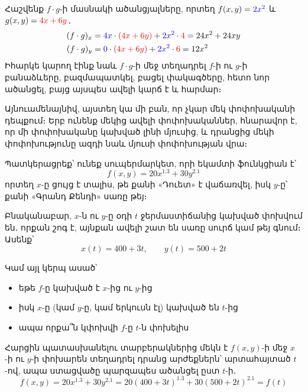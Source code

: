 
\begin{example}
Հաշվենք $f\cdot g$-ի մասնակի ածանցյալները, որտեղ $f(x,y) = {\color{myblue}{2x^2}}$ և $g(x,y) ={\color{myred}{4x + 6y}}$․
\begin{align*}
(f\cdot g)_{x} &= {\color{myblue}{4x}}  \cdot {\color{myred}{(4x + 6y)}} + {\color{myblue}{2x^{2}}} \cdot {\color{myred}{4}} = 24x^{2} + 24xy\\
(f\cdot g)_{y} &= {\color{myblue} 0}\cdot {\color{myred}{(4x + 6y)}} + {\color{myblue}{2x^{2}}} \cdot {\color{myred} 6} = 12x^{2}
\end{align*}
Իհարկե կարող էինք նաև $f\cdot g$-ի մեջ տեղադրել $f$-ի ու $g$-ի բանա\-ձևերը, բազմապատկել, բացել փակագծերը, հետո նոր ածանցել, բայց այսպես ավելի կարճ է և հարմար։
\end{example}

Այնուամենայնիվ, այստեղ կա մի բան, որ չկար մեկ փոփոխականի դեպքում։ Երբ ունենք մեկից ավելի փոփոխականներ, հնարավոր է, որ մի փոփոխականը կախված լինի մյուսից, և դրանցից մեկի փոփոխությունը ազդի նաև մյուսի փոփոխության վրա։

Պատկերացրեք՝ ունեք սուպերմարկետ, որի եկամտի ֆունկցիան է՝
\[
f(x,y) = 20x^{1.3} + 30y^{2.1}
\]
որտեղ $x$-ը ցույց է տալիս, թե քանի «Դուետ» է վաճառվել, իսկ $y$-ը՝ քանի «Գրանդ Քենդի» սառը թեյ։

Բնականաբար, $x$-ն ու $y$-ը օդի $t$ ջերմաստիճանից կախված փոխվում են․ որքան շոգ է, այնքան ավելի շատ են սառը սուրճ կամ թեյ գնում։ Ասենք՝
\[
x(t) = 400+3t, \qquad y(t) = 500+2t
\]

Կամ այլ կերպ ասած՝
\begin{itemize}
    \item եթե $f$-ը կախված է $x$-ից ու $y$-ից
    \item իսկ $x$-ը (կամ $y$-ը, կամ երկուսն էլ) կախված են $t$-ից
    \item ապա որքա՞ն կփոխվի $f$-ը $t$-ն փոխելիս
\end{itemize}

Հարցին պատասխանելու տարբերակներից մեկն է $f(x,y)$-ի մեջ $x$-ի ու $y$-ի փոխարեն տեղադրել դրանց արժեքներն՝ արտահայտած $t$-ով, ապա ստացվածը պարզապես ածանցել ըստ $t$-ի․
\[
f(x, y) = 20x^{1.3} + 30y^{2.1}
= 20(400+3t)^{1.3} + 30(500+2t)^{2.1} = f(t)
\]

